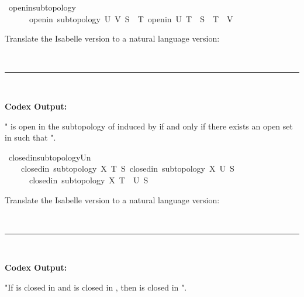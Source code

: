 \documentclass{article}
\begin{document}
\begin{boxB}
\begin{isabelle}
\isamarkupfalse \ openin{\isacharunderscore}{\kern0pt}subtopology{\isacharcolon}{\kern0pt}\ \isanewline
\ \ \ \ \ \ {\isachardoublequoteopen}openin\ {\isacharparenleft}{\kern0pt}subtopology\ U\ V{\isacharparenright}{\kern0pt}\ S\ {\isasymlongleftrightarrow}\ {\isacharparenleft}{\kern0pt}{\isasymexists}T{\isachardot}{\kern0pt}\ openin\ U\ T\ {\isasymand}\ S\ {\isacharequal}{\kern0pt}\ T\ {\isasyminter}\ V{\isacharparenright}{\kern0pt}{\isachardoublequoteclose}
\end{isabelle}
Translate the Isabelle version to a natural language version:

\
\hrule
\

\textbf{Codex Output:}

" is open in the subtopology of  induced by  if and only if there exists an open set  in  such that ".
\end{boxB}

\begin{boxB}
\begin{isabelle}
\isamarkupfalse \ closedin{\isacharunderscore}{\kern0pt}subtopology{\isacharunderscore}{\kern0pt}Un{\isacharcolon}{\kern0pt}\isanewline
\ \ \ \ {\isachardoublequoteopen}{\isasymlbrakk}closedin\ {\isacharparenleft}{\kern0pt}subtopology\ X\ T{\isacharparenright}{\kern0pt}\ S{\isacharsemicolon}{\kern0pt}\ closedin\ {\isacharparenleft}{\kern0pt}subtopology\ X\ U{\isacharparenright}{\kern0pt}\ S{\isasymrbrakk}\isanewline
\ \ \ \ \ {\isasymLongrightarrow}\ closedin\ {\isacharparenleft}{\kern0pt}subtopology\ X\ {\isacharparenleft}{\kern0pt}T\ {\isasymunion}\ U{\isacharparenright}{\kern0pt}{\isacharparenright}{\kern0pt}\ S{\isachardoublequoteclose}
\end{isabelle}
Translate the Isabelle version to a natural language version:

\
\hrule
\

\textbf{Codex Output:}

"If  is closed in  and  is closed in , then  is closed in ".
\end{boxB}
\end{document}
